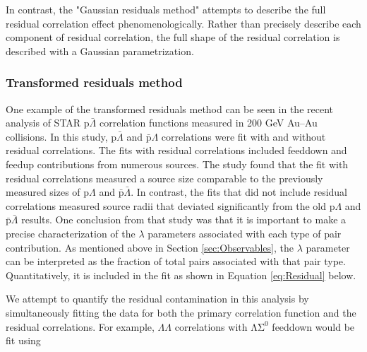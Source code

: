 In contrast, the "Gaussian residuals method" attempts to describe the full residual correlation effect phenomenologically.  
Rather than precisely describe each component of residual correlation, the full shape of the residual correlation is described with a Gaussian parametrization.  


\subsubsection{Transformed residuals method}
\label{sec:TransformedResiduals}


One example of the transformed residuals method can be seen in the recent analysis \cite{Kisiel:2014mma} of STAR p$\bar{\Lambda}$ correlation functions measured in 200 GeV Au--Au collisions.  
In this study, p$\bar{\Lambda}$ and $\bar{\mathrm{p}}\Lambda$ correlations were fit with and without residual correlations.  
The fits with residual correlations included feeddown and feedup contributions from numerous sources.  
The study found that the fit with residual correlations measured a source size comparable to the previously measured sizes of p$\Lambda$ and $\bar{\mathrm{p}}\bar{\Lambda}$.  
In contrast, the fits that did not include residual correlations measured source radii that deviated significantly from the old p$\Lambda$ and $\bar{\mathrm{p}}\bar{\Lambda}$ results.  
One conclusion from that study was that it is important to make a precise characterization of the $\lambda$ parameters associated with each type of pair contribution.  
As mentioned above in Section \ref{sec:Observables}, the $\lambda$ parameter can be interpreted as the fraction of total pairs associated with that pair type.  
Quantitatively, it is included in the fit as shown in Equation \ref{eq:Residual} below.

We attempt to quantify the residual contamination in this analysis by simultaneously fitting the data for both the primary correlation function and the residual correlations.  
For example, $\Lambda\Lambda$ correlations with $\mathrm{\Lambda\Sigma^0}$ feeddown would be fit using 

